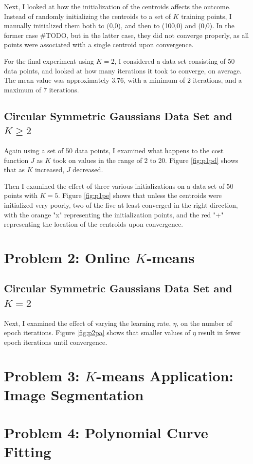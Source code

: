 \documentclass[conference]{IEEEtran}
\begin{document}
Next, I looked at how the initialization of the centroids affects the outcome. Instead of randomly initializing the centroids to a set of $K$ training points, I manually initialized them both to (0,0), and then to (100,0) and (0,0). In the former case #TODO, but in the latter case, they did not converge properly, as all points were associated with a single centroid upon convergence.

For the final experiment using $K=2$, I considered a data set consisting of 50 data points, and looked at how many iterations it took to converge, on average. The mean value was approximately $3.76$, with a minimum of $2$ iterations, and a maximum of $7$ iterations.

\subsection{Circular Symmetric Gaussians Data Set and $K\geq2$}
Again using a set of 50 data points, I examined what happens to the cost function $J$ as $K$ took on values in the range of 2 to 20. Figure \ref{fig:p1pd} shows that as $K$ increased, $J$ decreased.

Then I examined the effect of three various initializations on a data set of 50 points with $K=5$. Figure \ref{fig:p1pe} shows that unless the centroids were initialized very poorly, two of the five at least converged in the right direction, with the orange "x" representing the initialization points, and the red "+" representing the location of the centroids upon convergence.

\section{Problem 2: Online $K$-means}
\subsection{Circular Symmetric Gaussians Data Set and $K=2$}
Next, I examined the effect of varying the learning rate, $\eta$, on the number of epoch iterations. Figure \ref{fig:p2pa} shows that smaller values of $\eta$ result in fewer epoch iterations until convergence.

\section{Problem 3: $K$-means Application: Image Segmentation}
\section{Problem 4: Polynomial Curve Fitting}
\end{document}
